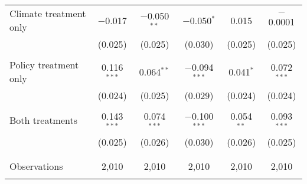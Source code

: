 \begin{tabular}{@{\extracolsep{5pt}}lccccc}
 Climate treatment only & $-$0.017 & $-$0.050$^{**}$ & $-$0.050$^{*}$ & 0.015 & $-$0.0001 \\ 
  & (0.025) & (0.025) & (0.030) & (0.025) & (0.025) \\ 
  & & & & & \\ 
 Policy treatment only & 0.116$^{***}$ & 0.064$^{**}$ & $-$0.094$^{***}$ & 0.041$^{*}$ & 0.072$^{***}$ \\ 
  & (0.024) & (0.025) & (0.029) & (0.024) & (0.024) \\ 
  & & & & & \\ 
 Both treatments & 0.143$^{***}$ & 0.074$^{***}$ & $-$0.100$^{***}$ & 0.054$^{**}$ & 0.093$^{***}$ \\ 
  & (0.025) & (0.026) & (0.030) & (0.026) & (0.025) \\ 
  & & & & & \\ 
\hline \\[-1.8ex] 

Observations & 2,010 & 2,010 & 2,010 & 2,010 & 2,010 \\ 
\hline 
\hline \\[-1.8ex] 
\end{tabular} 